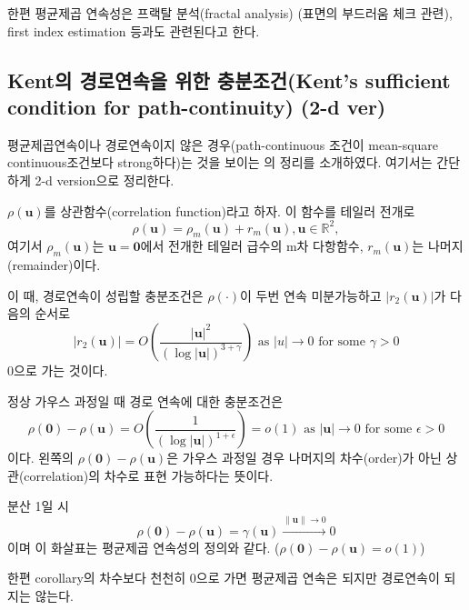 \documentclass[b5paper,]{scrbook}
\theoremstyle{plain}
\theoremstyle{definition}
\numberwithin{equation}{section}
\let\BeginKnitrBlock\begin \let\EndKnitrBlock\end
\begin{document}
한편 평균제곱 연속성은 프랙탈 분석(fractal analysis) (표면의 부드러움 체크 관련), first index estimation 등과도 관련된다고 한다.

\hypertarget{kent---kents-sufficient-condition-for-path-continuity-2-d-ver}{%
\subsection{Kent의 경로연속을 위한 충분조건(Kent's sufficient condition for path-continuity) (2-d ver)}\label{kent---kents-sufficient-condition-for-path-continuity-2-d-ver}}

평균제곱연속이나 경로연속이지 않은 경우(path-continuous 조건이 mean-square continuous조건보다 strong하다)는 것을 보이는 \citep{Kent1989}의 정리를 소개하였다. 여기서는 간단하게 2-d version으로 정리한다.

\BeginKnitrBlock{theorem}[Kent의 경로연속을 위한 충분조건]
\protect\hypertarget{thm:unnamed-chunk-365}{}{\label{thm:unnamed-chunk-365} {} }\(\rho(\mathbf{u})\)를 상관함수(correlation function)라고 하자. 이 함수를 테일러 전개로
\[\rho(\mathbf{u})=\rho_{m}(\mathbf{u})+r_{m}(\mathbf{u}), \mathbf{u} \in \mathbb{R}^{2},\]
여기서 \(\rho_{m}(\mathbf{u})\)는 \(\mathbf{u}=\mathbf{0}\)에서 전개한 테일러 급수의 m차 다항함수, \(r_{m}(\mathbf{u})\)는 나머지(remainder)이다.
\EndKnitrBlock{theorem}

이 때, 경로연속이 성립할 충분조건은 \(\rho (\cdot)\)이 두번 연속 미분가능하고 \(|r_{2}(\mathbf{u})|\)가 다음의 순서로
\[|r_{2}(\mathbf{u})|=O(\frac{|\mathbf{u}|^{2}}{(\log |\mathbf{u}|)^{3+\gamma}}) \text{ as } |u| \rightarrow 0 \text{ for some } \gamma >0\]
0으로 가는 것이다.

\BeginKnitrBlock{corollary}
\protect\hypertarget{cor:unnamed-chunk-366}{}{\label{cor:unnamed-chunk-366} }정상 가우스 과정일 때 경로 연속에 대한 충분조건은
\[\rho(\mathbf{0})-\rho(\mathbf{u})=O(\frac{1}{(\log |\mathbf{u}|)^{1+\epsilon}})=o(1) \text{ as } |\mathbf{u}| \rightarrow 0 \text{ for some } \epsilon > 0\]
이다. 왼쪽의 \(\rho(\mathbf{0})-\rho(\mathbf{u})\)은 가우스 과정일 경우 나머지의 차수(order)가 아닌 상관(correlation)의 차수로 표현 가능하다는 뜻이다.
\EndKnitrBlock{corollary}

분산 1일 시
\[\rho(\mathbf{0})-\rho(\mathbf{u})=\gamma(\mathbf{u}) \stackrel{\|\mathbf{u}\| \rightarrow 0}{\rightarrow} 0\]
이며 이 화살표는 평균제곱 연속성의 정의와 같다. (\(\rho(\mathbf{0})-\rho(\mathbf{u})=o(1)\))

한편 corollary의 차수보다 천천히 0으로 가면 평균제곱 연속은 되지만 경로연속이 되지는 않는다.
\end{document}
